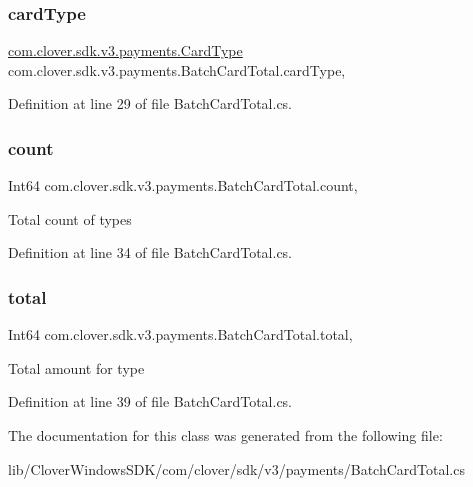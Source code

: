 \subsubsection{\texorpdfstring{card\+Type}{cardType}}
{\footnotesize\ttfamily \hyperlink{namespacecom_1_1clover_1_1sdk_1_1v3_1_1payments_ae544d2f27295fd15a3abb7d87bc35928}{com.\+clover.\+sdk.\+v3.\+payments.\+Card\+Type} com.\+clover.\+sdk.\+v3.\+payments.\+Batch\+Card\+Total.\+card\+Type\hspace{0.3cm}{\ttfamily [get]}, {\ttfamily [set]}}



Definition at line 29 of file Batch\+Card\+Total.\+cs.

\mbox{\label{classcom_1_1clover_1_1sdk_1_1v3_1_1payments_1_1_batch_card_total_a1e20b6f11fba6e10795618ab141cad98}} 
\subsubsection{\texorpdfstring{count}{count}}
{\footnotesize\ttfamily Int64 com.\+clover.\+sdk.\+v3.\+payments.\+Batch\+Card\+Total.\+count\hspace{0.3cm}{\ttfamily [get]}, {\ttfamily [set]}}



Total count of types 



Definition at line 34 of file Batch\+Card\+Total.\+cs.

\mbox{\label{classcom_1_1clover_1_1sdk_1_1v3_1_1payments_1_1_batch_card_total_a7dff34fb76e90d7e78ca8031b03913b3}} 
\subsubsection{\texorpdfstring{total}{total}}
{\footnotesize\ttfamily Int64 com.\+clover.\+sdk.\+v3.\+payments.\+Batch\+Card\+Total.\+total\hspace{0.3cm}{\ttfamily [get]}, {\ttfamily [set]}}



Total amount for type 



Definition at line 39 of file Batch\+Card\+Total.\+cs.



The documentation for this class was generated from the following file\+:\begin{DoxyCompactItemize}
\item 
lib/\+Clover\+Windows\+S\+D\+K/com/clover/sdk/v3/payments/Batch\+Card\+Total.\+cs\end{DoxyCompactItemize}
